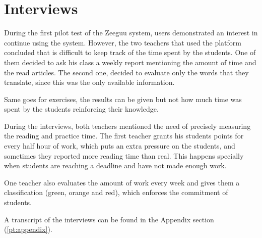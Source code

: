 \chapter{Interviews}\label{p02:interviews}

During the first pilot test of the Zeeguu system, users demonstrated an interest in continue using the system. However, the two teachers that used the platform concluded that is difficult to keep track of the time spent by the students. One of them decided to ask his class a weekly report mentioning the amount of time and the read articles. The second one, decided to evaluate only the words that they translate, since this was the only available information.

Same goes for exercises, the results can be given but not how much time was spent by the students reinforcing their knowledge.

During the interviews, both teachers mentioned the need of precisely measuring the reading and practice time. The first teacher grants his students points for every half hour of work, which puts an extra pressure on the students, and sometimes they reported more reading time than real. This happens specially when students are reaching a deadline and have not made enough work. 

One teacher also evaluates the amount of work every week and gives them a classification (\Ie green, orange and red), which enforces the commitment of students.

A transcript of the interviews can be found in the Appendix section (\ref{pt:appendix}).
